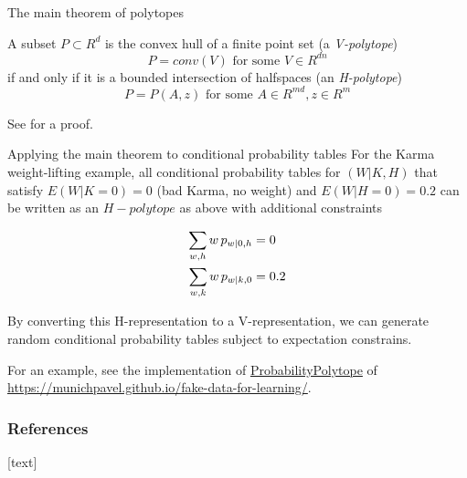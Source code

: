\begin{frame}{The main theorem of polytopes}

  \begin{theorem}
    A subset $P \subset R^d$ is the convex hull of a finite point set (a \emph{V-polytope})
    \begin{equation*}
      P = conv(V) \textrm{ for some }V \in R^{dn}
    \end{equation*}
    if and only if it is a bounded intersection of halfspaces (an \emph{H-polytope})
    \begin{equation*}
      P = P(A,z) \textrm{ for some }A \in R^{md}, z \in R^m
    \end{equation*}
  \end{theorem}

  See \cite{ziegler2012lectures} for a proof.\newline
\end{frame}


\begin{frame}{Applying the main theorem to conditional probability tables}
  For the Karma weight-lifting example, all conditional probability tables for $(W | K, H)$ that satisfy $E(W | K = 0) = 0$ (bad Karma, no weight) and $E(W | H = 0)=0.2$ can be written as an $H-polytope$ as above with additional constraints

  \begin{align*}
    \sum_{w, h} w \, p_{w | 0, h} &= 0\\
    \sum_{w, k} w \, p_{w | k, 0} & = 0.2\newline
  \end{align*}

  By converting this H-representation to a V-representation, we can generate random conditional probability tables subject to expectation constrains.\newline

  For an example, see the implementation of \href{https://munichpavel.github.io/fake-data-docs/html/\_modules/fake\_data\_for\_learning/utils.html\#ProbabilityPolytope}{ProbabilityPolytope} of \href{https://munichpavel.github.io/fake-data-for-learning/}{https://munichpavel.github.io/fake-data-for-learning/}.

\end{frame}

\begin{frame}[allowframebreaks]
  \frametitle{References}
  [text]
  
  
\end{frame}

